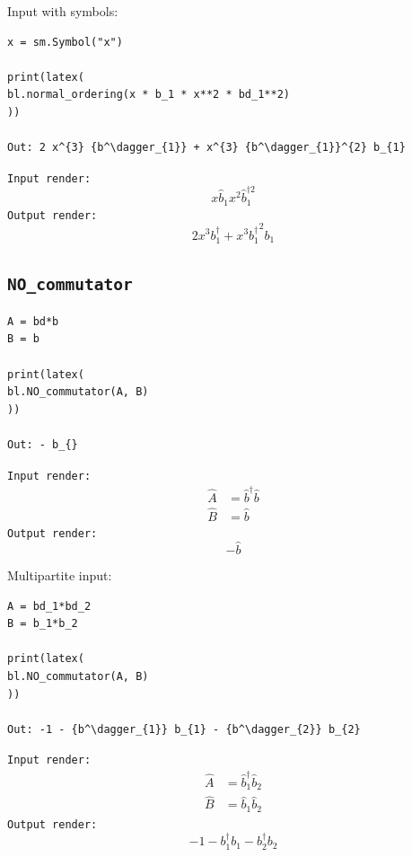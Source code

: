 \documentclass[5p, twocolumn, 10pt, sort&compress]{elsarticle}
\newcommand{\inlinecode}[1]{\texttt{#1}}
\newcommand{\bop}{\hat{b}}
\newcommand{\bdag}{\bop^\dagger}
\newcommand{\bdagn}[1]{\bop^{\dagger {#1}}}
\newenvironment{revision2}{%
\color{red}
}
{}
\begin{document}
\noindent Input with symbols:
\begin{verbatim}
x = sm.Symbol("x")

print(latex(
bl.normal_ordering(x * b_1 * x**2 * bd_1**2)
))

Out: 2 x^{3} {b^\dagger_{1}} + x^{3} {b^\dagger_{1}}^{2} b_{1}
\end{verbatim}
\begin{revision2}
\inlinecode{Input render:}
\begin{equation*}
    x\bop_1 x^2 \bdagn{2}_1
\end{equation*}
\noindent\noindent\inlinecode{Output render:}
\begin{equation*}
    2 x^{3} {b^\dagger_{1}} + x^{3} {b^\dagger_{1}}^{2} b_{1}
\end{equation*}
\end{revision2}


\subsection{\inlinecode{NO_commutator}}

\begin{verbatim}
A = bd*b
B = b

print(latex(
bl.NO_commutator(A, B)
))

Out: - b_{}     
\end{verbatim}
\begin{revision2}
\noindent\inlinecode{Input render:}
\begin{align*}
    \hat{A} &= \bdag\bop
    \\
    \hat{B} &= \bop
\end{align*}
\noindent\noindent\inlinecode{Output render:}
\begin{equation*}
    -\bop
\end{equation*}
\end{revision2}

\noindent Multipartite input:
\begin{verbatim}
A = bd_1*bd_2
B = b_1*b_2

print(latex(
bl.NO_commutator(A, B)
))

Out: -1 - {b^\dagger_{1}} b_{1} - {b^\dagger_{2}} b_{2}
\end{verbatim}
\begin{revision2}
\noindent\inlinecode{Input render:}
\begin{align*}
    \hat{A} &= \bdag_1\bop_2
    \\
    \hat{B} &= \bop_1\bop_2
\end{align*}
\noindent\noindent\inlinecode{Output render:}
\begin{equation*}
    -1 - {b^\dagger_{1}} b_{1} - {b^\dagger_{2}} b_{2}
\end{equation*}
\end{revision2}
\end{document}
